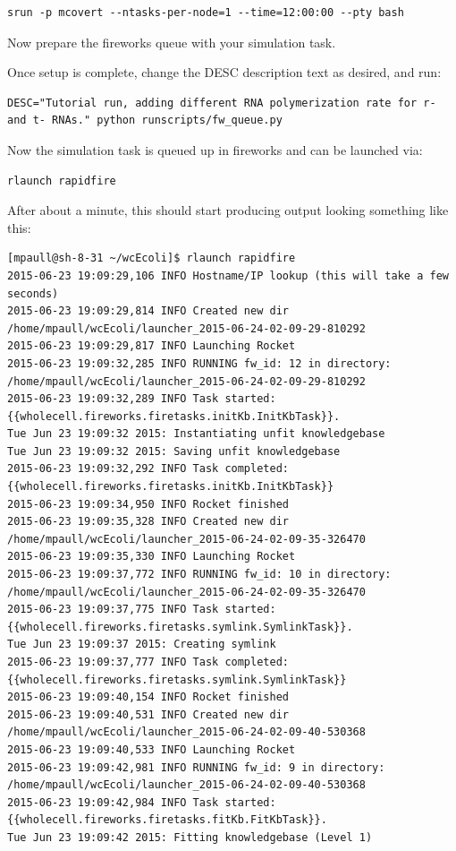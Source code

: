 \documentclass[12pt]{article}
\begin{document}
\begin{lstlisting}
srun -p mcovert --ntasks-per-node=1 --time=12:00:00 --pty bash
\end{lstlisting}

Now prepare the fireworks queue with your simulation task. 
\par
Once setup is complete, change the DESC description text as desired, and run:

\begin{lstlisting}
DESC="Tutorial run, adding different RNA polymerization rate for r- and t- RNAs." python runscripts/fw_queue.py
\end{lstlisting}

Now the simulation task is queued up in fireworks and can be launched via:

\begin{lstlisting}
rlaunch rapidfire
\end{lstlisting}

After about a minute, this should start producing output looking something like this:

\begin{lstlisting}
[mpaull@sh-8-31 ~/wcEcoli]$ rlaunch rapidfire
2015-06-23 19:09:29,106 INFO Hostname/IP lookup (this will take a few seconds)
2015-06-23 19:09:29,814 INFO Created new dir /home/mpaull/wcEcoli/launcher_2015-06-24-02-09-29-810292
2015-06-23 19:09:29,817 INFO Launching Rocket
2015-06-23 19:09:32,285 INFO RUNNING fw_id: 12 in directory: /home/mpaull/wcEcoli/launcher_2015-06-24-02-09-29-810292
2015-06-23 19:09:32,289 INFO Task started: {{wholecell.fireworks.firetasks.initKb.InitKbTask}}.
Tue Jun 23 19:09:32 2015: Instantiating unfit knowledgebase
Tue Jun 23 19:09:32 2015: Saving unfit knowledgebase
2015-06-23 19:09:32,292 INFO Task completed: {{wholecell.fireworks.firetasks.initKb.InitKbTask}} 
2015-06-23 19:09:34,950 INFO Rocket finished
2015-06-23 19:09:35,328 INFO Created new dir /home/mpaull/wcEcoli/launcher_2015-06-24-02-09-35-326470
2015-06-23 19:09:35,330 INFO Launching Rocket
2015-06-23 19:09:37,772 INFO RUNNING fw_id: 10 in directory: /home/mpaull/wcEcoli/launcher_2015-06-24-02-09-35-326470
2015-06-23 19:09:37,775 INFO Task started: {{wholecell.fireworks.firetasks.symlink.SymlinkTask}}.
Tue Jun 23 19:09:37 2015: Creating symlink
2015-06-23 19:09:37,777 INFO Task completed: {{wholecell.fireworks.firetasks.symlink.SymlinkTask}} 
2015-06-23 19:09:40,154 INFO Rocket finished
2015-06-23 19:09:40,531 INFO Created new dir /home/mpaull/wcEcoli/launcher_2015-06-24-02-09-40-530368
2015-06-23 19:09:40,533 INFO Launching Rocket
2015-06-23 19:09:42,981 INFO RUNNING fw_id: 9 in directory: /home/mpaull/wcEcoli/launcher_2015-06-24-02-09-40-530368
2015-06-23 19:09:42,984 INFO Task started: {{wholecell.fireworks.firetasks.fitKb.FitKbTask}}.
Tue Jun 23 19:09:42 2015: Fitting knowledgebase (Level 1)
 \end{lstlisting}
\end{document}
